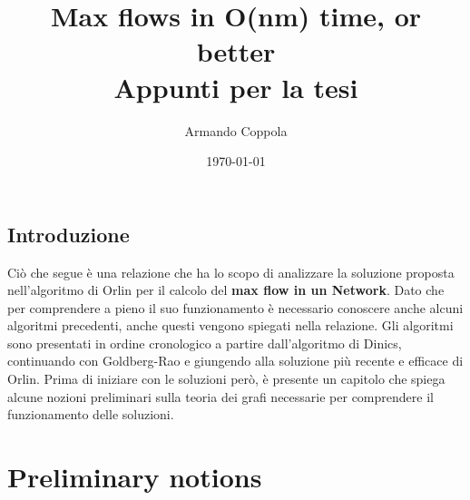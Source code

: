 \documentclass[a4paper, 11pt]{report}
\title{Max flows in O(nm) time, or better\\
\large Appunti per la tesi}
\author{Armando Coppola}
\date{\today}
\begin{document}
\maketitle
\newpage
\tableofcontents
\newpage
\section*{Introduzione}
Ciò che segue è una relazione che ha lo scopo di analizzare la soluzione proposta nell'algoritmo di Orlin per il calcolo del \textbf{max flow in un Network}.
Dato che per comprendere a pieno il suo funzionamento è necessario conoscere anche alcuni algoritmi precedenti, anche questi vengono spiegati nella relazione. 
Gli algoritmi sono presentati in ordine cronologico a partire dall'algoritmo di Dinics, continuando con Goldberg-Rao e giungendo alla soluzione più recente e efficace di Orlin.
Prima di iniziare con le soluzioni però, è presente un capitolo che spiega alcune nozioni preliminari sulla teoria dei grafi necessarie per comprendere il funzionamento delle soluzioni.

\chapter{Preliminary notions}
\end{document}
